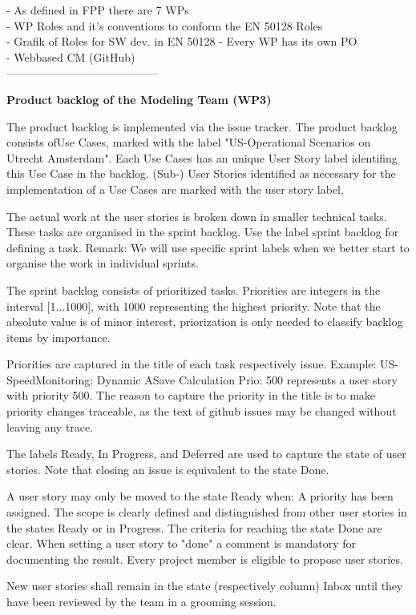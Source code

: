 - As defined in FPP there are 7 WPs\\
- WP Roles and it's conventions to conform the EN 50128 Roles\\
- Grafik of Roles for SW dev. in EN 50128 
- Every WP has its own PO\\
- Webbased CM (GitHub)\\
-----------------------------------------


\textbf{Product backlog of the Modeling Team (WP3)}

The product backlog is implemented via the issue tracker.
The product backlog consists ofUse Cases, marked with the label "US-Operational Scenarios on Utrecht Amsterdam".
Each Use Cases has an unique User Story label identifing this Use Case in the backlog.
(Sub-) User Stories identified as necessary for the implementation of a Use Cases are marked with the user story label,

The actual work at the user stories is broken down in smaller technical tasks. These tasks are organised in the sprint backlog. Use the label sprint backlog for defining a task.
Remark: We will use specific sprint labels when we better start to organise the work in individual sprints.

The sprint backlog consists of prioritized tasks. Priorities are integers in the interval [1...1000], with 1000 representing the highest priority. Note that the absolute value is of minor interest, priorization is only needed to classify backlog items by importance.

Priorities are captured in the title of each task respectively issue. Example: US-SpeedMonitoring: Dynamic ASave Calculation Prio: 500 represents a user story with priority 500. The reason to capture the priority in the title is to make priority changes traceable, as the text of github issues may be changed without leaving any trace.

The labels Ready, In Progress, and Deferred are used to capture the state of user stories. Note that closing an issue is equivalent to the state Done.

A user story may only be moved to the state Ready when:
	A priority has been assigned.
	The scope is clearly defined and distinguished from other user stories in the states Ready or in Progress.
	The criteria for reaching the state Done are clear.
	When setting a user story to "done" a comment is mandatory for documenting the result.
	Every project member is eligible to propose user stories.

New user stories shall remain in the state (respectively column) Inbox until they have been reviewed by the team in a grooming session. 





